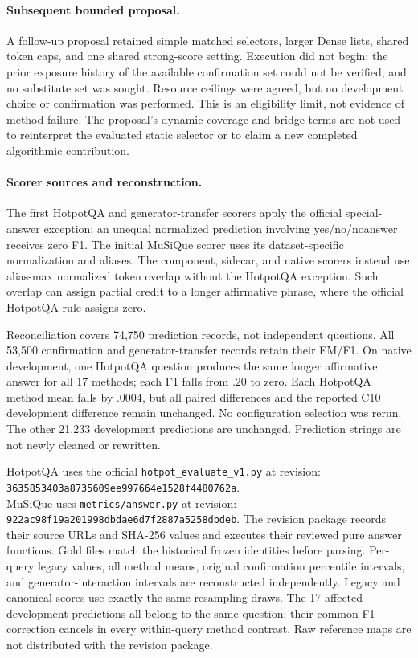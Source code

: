 \documentclass[11pt,a4paper]{article}
\begin{document}
\paragraph{Subsequent bounded proposal.}
A follow-up proposal retained simple matched selectors, larger Dense lists,
shared token caps, and one shared strong-score setting. Execution did not
begin: the prior exposure history of the available confirmation set could
not be verified, and no substitute set was sought. Resource ceilings were
agreed, but no development choice or confirmation was performed. This is an
eligibility limit, not evidence of method failure. The proposal's dynamic
coverage and bridge terms are not used to reinterpret the evaluated static
selector or to claim a new completed algorithmic contribution.

\paragraph{Scorer sources and reconstruction.}
The first HotpotQA and generator-transfer scorers apply the official
special-answer exception: an unequal normalized prediction involving
yes/no/noanswer receives zero F1. The initial MuSiQue scorer uses its
dataset-specific normalization and aliases. The component, sidecar, and
native scorers instead use alias-max normalized token overlap without the
HotpotQA exception. Such overlap can assign partial credit to a longer
affirmative phrase, where the official HotpotQA rule assigns zero.

Reconciliation covers 74,750 prediction records, not independent questions.
All 53,500 confirmation and generator-transfer records retain their EM/F1.
On native development, one HotpotQA question produces the same longer
affirmative answer for all 17 methods; each F1 falls from $.20$ to zero.
Each HotpotQA method mean falls by $.0004$, but all paired differences and
the reported C10 development difference remain unchanged. No configuration
selection was rerun. The other 21,233 development predictions are unchanged.
Prediction strings are not newly cleaned or rewritten.

HotpotQA uses the official \texttt{hotpot\_evaluate\_v1.py} at revision:\\
\texttt{3635853403a8735609ee997664e1528f4480762a}.\\
MuSiQue uses \texttt{metrics/answer.py} at revision:\\
\texttt{922ac98f19a201998dbdae6d7f2887a5258dbdeb}.
The revision package records
their source URLs and SHA-256 values and executes their reviewed pure answer
functions. Gold files match the historical frozen identities before parsing.
Per-query legacy values, all method means, original confirmation percentile
intervals, and generator-interaction intervals are reconstructed independently.
Legacy and canonical scores use exactly the same resampling draws. The
17 affected development predictions all belong to the same question; their
common F1 correction cancels in every within-query method contrast. Raw
reference maps are not distributed with the revision package.
\end{document}
